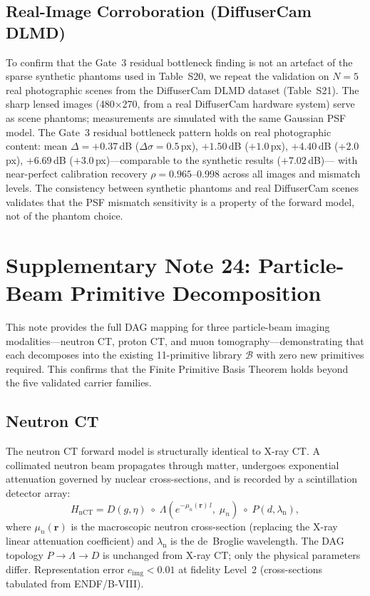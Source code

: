 \documentclass[11pt]{article}
\theoremstyle{definition}
\begin{document}
\subsection{Real-Image Corroboration (DiffuserCam DLMD)}
To confirm that the Gate~3 residual bottleneck finding is not an artefact of the sparse synthetic phantoms used in Table~S20,
we repeat the validation on $N{=}5$ real photographic scenes from the DiffuserCam DLMD dataset
\cite{Antipa2018} (Table~S21).
The sharp lensed images (480$\times$270, from a real DiffuserCam hardware system)
serve as scene phantoms; measurements are simulated with the same Gaussian PSF model.
The Gate~3 residual bottleneck pattern holds on real photographic content:
mean $\Delta{=}+0.37$\,dB ($\Delta\sigma{=}0.5$\,px), $+1.50$\,dB ($+1.0$\,px),
$+4.40$\,dB ($+2.0$\,px), $+6.69$\,dB ($+3.0$\,px)---comparable to the synthetic results ($+7.02$\,dB)---
with near-perfect calibration recovery $\rho{=}0.965$--$0.998$ across all images and mismatch levels.
The consistency between synthetic phantoms and real DiffuserCam scenes validates that the PSF mismatch
sensitivity is a property of the forward model, not of the phantom choice.


\section{Supplementary Note 24: Particle-Beam Primitive Decomposition}
\label{sec:note_particle_beams}

This note provides the full DAG mapping for three particle-beam imaging
modalities---neutron CT, proton CT, and muon tomography---demonstrating that
each decomposes into the existing 11-primitive library $\mathcal{B}$ with
zero new primitives required.  This confirms that the Finite Primitive Basis
Theorem holds beyond the five validated carrier families.

\subsection{Neutron CT}

The neutron CT forward model is structurally identical to X-ray CT.
A collimated neutron beam propagates through matter, undergoes exponential
attenuation governed by nuclear cross-sections, and is recorded by a
scintillation detector array:
\[
  H_{\mathrm{nCT}} = D(g,\eta) \;\circ\;
  \Lambda\!\left(e^{-\mu_n(\mathbf{r})\,l},\;\mu_n\right)
  \;\circ\; P(d,\lambda_{\mathrm{n}}),
\]
where $\mu_n(\mathbf{r})$ is the macroscopic neutron cross-section (replacing
the X-ray linear attenuation coefficient) and $\lambda_{\mathrm{n}}$ is the
de~Broglie wavelength.  The DAG topology $P \to \Lambda \to D$ is unchanged
from X-ray CT; only the physical parameters differ.  Representation error
$e_{\mathrm{img}} < 0.01$ at fidelity Level~2 (cross-sections tabulated from
ENDF/B-VIII).
\end{document}

